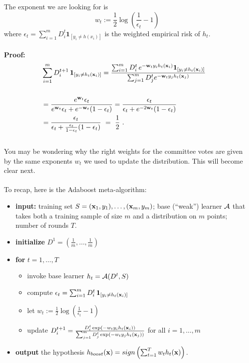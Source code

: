\\~\\
The exponent we are looking for is
\[
  w_t := \frac{1}{2}\log\left( \frac{1}{\epsilon_t} -1 \right)
\]
where $ \epsilon_t = \sum_{i=1}^m D^t_i\mathbf{1}_{[y_i \neq h(x_i)]} $ is the
weighted empirical risk of $h_t$.
\\~\\
{\bf Proof:} \begin{align*}
  &\sum_{i=1}^m D^{t+1}_i \, \mathbf{1}_{[y_i \neq h_t({\mathbf x}_i)]}  =  \frac{ \sum_{i=1}^m
	D^t_i \, e^{-{\mathbf w}_ty_ih_t({\mathbf x}_i)}
      \mathbf{1}_{[y_i \neq h_t({\mathbf x}_i)]} }{\sum_{j=1}^{m}D^t_j e^{-{\mathbf w}_t
    y_jh_t({\mathbf x}_j)} }\\
&\\ 
&=  \frac{ e^{{\mathbf w}_t} \epsilon_t }{e^{{\mathbf w}_t} \epsilon_t  + e^{-{\mathbf w}_t}
  (1-\epsilon_t ) } =  \frac{  \epsilon_t }{ \epsilon_t + e^{-2{\mathbf w}_t}
  (1-\epsilon_t) }
&\\ 
&=  \frac{  \epsilon_t }{ \epsilon_t +
  \frac{\epsilon_t}{1-\epsilon_t} (1-\epsilon_t) } ~=~ \frac{1}{2}~. 
\end{align*}
~\\
You may be wondering why the right weights for the committee votes are given by
the same exponents $w_t$ we used to update the distribution. This will become
clear next.
\\
~\\
To recap, here is the Adaboost meta-algorithm:
\begin{itemize}
\item \textbf{input:} training set $S=({\mathbf x}_1,y_1),\ldots,({\mathbf x}_m,y_m)$;
  base (``weak'') learner $\mathcal{A}$ that takes both a training sample of size $m$ and a
  distribution on $m$ points; number of rounds $T$.
\item \textbf{initialize} $D^1= (\frac{1}{m},\ldots,\frac{1}{m})$
\item \textbf{for} $t=1,\ldots,T$
\begin{itemize}
\item   invoke base learner $h_t = \mathcal{A}(D^t,S)$
\item compute $\epsilon_t = \sum_{i=1}^m D^t_i
  \, \mathbf{1}_{[y_i \neq h_t({\mathbf x}_i)]} $ 
\item let $w_t:=\frac{1}{2}\log\left(\frac{1}{\epsilon_t}-1\right)$
\item update $D^{t+1}_i = \frac{D^t_i
    \exp(-w_ty_ih_t({\mathbf x}_i))}{\sum_{j=1}^{m}D^t_j\exp(-w_t
    y_jh_t({\mathbf x}_j))}$
  for all $i=1,\ldots,m$ 
\end{itemize}
\item \textbf{output} the hypothesis $h_{boost}({\mathbf x})=sign\left(\sum_{t=1}^{T} w_t
    h_t({\mathbf x})\right)$.
\end{itemize}



